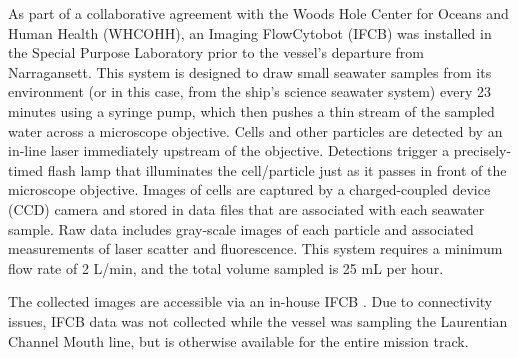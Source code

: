 \documentclass[12pt]{article}\usepackage[]{graphicx}\usepackage[]{color}
\begin{document}
As part of a collaborative agreement with the Woods Hole Center for Oceans and Human Health (WHCOHH), an Imaging FlowCytobot (IFCB) was installed in the Special Purpose Laboratory prior to the vessel's departure from Narragansett. This system is designed to draw small seawater samples from its environment (or in this case, from the ship's science seawater system) every 23 minutes using a syringe pump, which then pushes a thin stream of the sampled water across a microscope objective. Cells and other particles are detected by an in-line laser immediately upstream of the objective. Detections trigger a precisely-timed flash lamp that illuminates the cell/particle just as it passes in front of the microscope objective. Images of cells are captured by a charged-coupled device (CCD) camera and stored in data files that are associated with each seawater sample. Raw data includes gray-scale images of each particle and associated measurements of laser scatter and fluorescence. This system requires a minimum flow rate of 2 L/min, and the total volume sampled is 25 mL per hour.

The collected images are accessible via an in-house IFCB . Due to connectivity issues, IFCB data was not collected while the vessel was sampling the Laurentian Channel Mouth line, but is otherwise available for the entire mission track.
\end{document}
